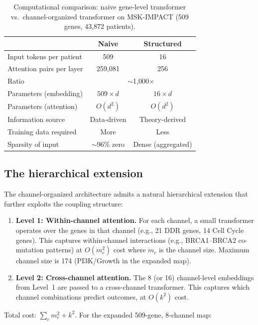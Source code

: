 \begin{table}[ht]
\centering
\caption{Computational comparison: naive gene-level transformer
vs.\ channel-organized transformer on MSK-IMPACT (509 genes,
43{,}872 patients).}
\label{tab:complexity}
\begin{tabular}{@{}lcc@{}}
\toprule
& \textbf{Naive} & \textbf{Structured} \\
\midrule
Input tokens per patient & 509 & 16 \\
Attention pairs per layer & 259{,}081 & 256 \\
Ratio & \multicolumn{2}{c}{$\sim$1{,}000$\times$} \\
\midrule
Parameters (embedding) & $509 \times d$ & $16 \times d$ \\
Parameters (attention) & $O(d^2)$ & $O(d^2)$ \\
\midrule
Information source & Data-driven & Theory-derived \\
Training data required & More & Less \\
Sparsity of input & $\sim$96\% zero & Dense (aggregated) \\
\bottomrule
\end{tabular}
\end{table}

\subsection{The hierarchical extension}

The channel-organized architecture admits a natural hierarchical
extension that further exploits the coupling structure:

\begin{enumerate}
\item \textbf{Level 1: Within-channel attention.} For each
channel, a small transformer operates over the genes in that
channel (e.g., 21 DDR genes, 14 Cell Cycle genes). This captures
within-channel interactions (e.g., BRCA1--BRCA2 co-mutation
patterns) at $O(m_c^2)$ cost where $m_c$ is the channel size.
Maximum channel size is 174 (PI3K/Growth in the expanded map).

\item \textbf{Level 2: Cross-channel attention.} The 8 (or 16)
channel-level embeddings from Level~1 are passed to a
cross-channel transformer. This captures which channel
combinations predict outcomes, at $O(k^2)$ cost.
\end{enumerate}

Total cost: $\sum_c m_c^2 + k^2$. For the expanded 509-gene,
8-channel map:

